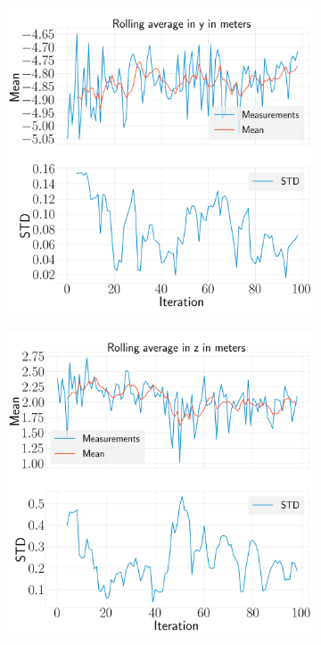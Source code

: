 \documentclass[../Head/report.tex]{subfiles}
\begin{document}
\begin{figure}[H]
\begin{subfigure}[t]{.30\textwidth}
        \includegraphics[width=\textwidth]{../Figures/analyse_rolling_average/test2/Calculated_rolling_average_in_y_with_mean_and_STD.png}
        \caption{}
        \label{fig:rolling_average_in_y_test2}
    \end{subfigure}
     \hspace{0.2em}
    \begin{subfigure}[t]{.30\textwidth}
        \centering
        \includegraphics[width=\textwidth]{../Figures/analyse_rolling_average/test2/Calculated_rolling_average_in_z_with_mean_and_STD.png}

\end{subfigure}
\end{figure}
\end{document}
